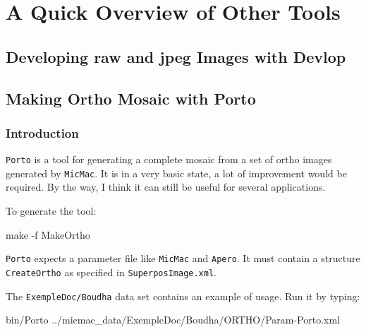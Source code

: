 \chapter{A Quick Overview of Other Tools}





\section{Developing raw and jpeg Images with Devlop}



\section{Making Ortho Mosaic with Porto}
\label{Porto}

\subsection{Introduction}

{\tt Porto}  is a tool for generating a complete mosaic from a set of 
ortho images generated by {\tt MicMac}. It is in a very basic state,
a lot of improvement would be required. By the way, I think  it can
still be useful for several applications.

To generate the tool:

\begin{center}
     make -f MakeOrtho
\end{center}

{\tt Porto} expects a parameter file like {\tt MicMac} and {\tt Apero}. It
must contain a structure {\tt CreateOrtho} as specified in {\tt SuperposImage.xml}.

The {\tt ExempleDoc/Boudha} data set contains an example of usage. Run it
by typing:

\begin{center}
                  bin/Porto ../micmac\_data/ExempleDoc/Boudha/ORTHO/Param-Porto.xml
\end{center}

